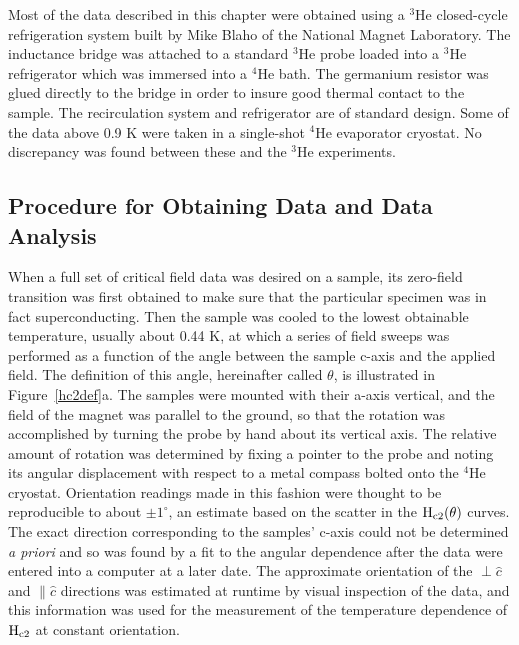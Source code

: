 	Most of the  data described in  this chapter were obtained  using a
$^3$He closed-cycle refrigeration system   built  by  Mike  Blaho   of  the
National  Magnet Laboratory.   The inductance  bridge   was attached to   a
standard $^3$He probe loaded into a $^3$He refrigerator  which was immersed
into a  $^4$He  bath.  The   germanium resistor was  glued  directly to the
bridge in  order  to  insure   good  thermal contact  to  the  sample.  The
recirculation system and refrigerator are of standard design.\cite{betts76}
Some of the data above 0.9 K were taken in a single-shot  $^4$He evaporator
cryostat.  No  discrepancy was    found  between   these  and  the   $^3$He
experiments.

\subsection{Procedure for Obtaining Data and Data Analysis}
\label{procedure}

	When a full set of critical field data was desired on a sample, its
zero-field transition was first  obtained to make sure  that the particular
specimen was  in fact superconducting.  Then the  sample  was cooled to the
lowest obtainable temperature, usually about 0.44 K,  at which a  series of
field sweeps was performed as  a function of the  angle between the  sample
c-axis  and the applied field.  The   definition of this angle, hereinafter
called $\theta$, is  illustrated in Figure~\ref{hc2def}a.  The samples were
mounted with  their a-axis  vertical, and   the  field of   the  magnet was
parallel to  the ground, so  that the rotation  was accomplished by turning
the probe by hand about its vertical axis.  The relative amount of rotation
was determined by fixing  a pointer to   the  probe and noting its  angular
displacement  with   respect to  a metal  compass  bolted  onto  the $^4$He
cryostat.  Orientation readings made  in  this fashion were thought   to be
reproducible to about $\pm 1^{\circ}$, an estimate  based on the scatter in
the $\rm H_{c2}(\theta)$ curves.  The exact  direction corresponding to the
samples' c-axis could not be determined {\em a priori}  and so was found by
a fit to the angular dependence after the data were entered into a computer
at  a later date.  The  approximate orientation of  the $\perp \hat{c}$ and
$\parallel  \hat{c}$   directions  was   estimated  at runtime   by  visual
inspection of the data, and this information  was used  for the measurement
of the temperature dependence of $\rm H_{c2}$ at constant orientation.

